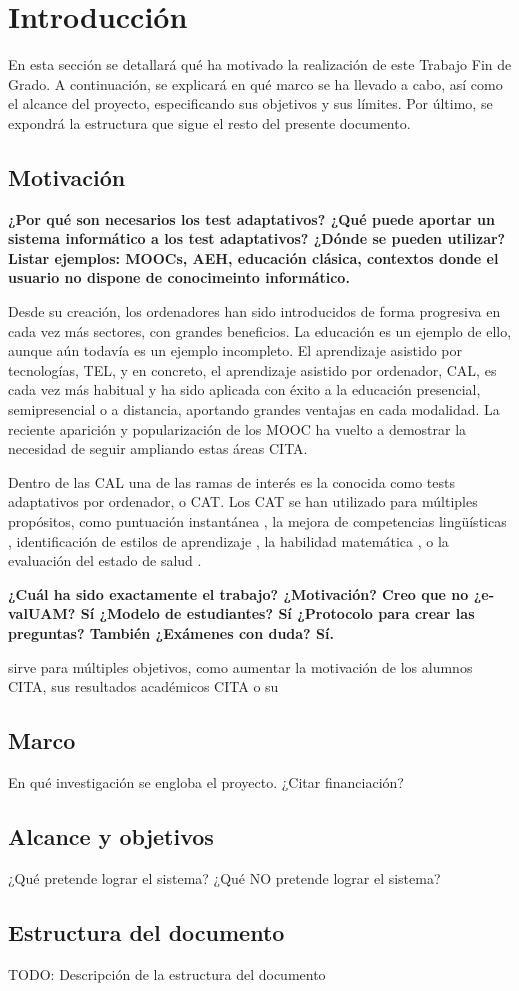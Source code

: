 \chapter{Introducción \label{sec:introduccion}}

En esta sección se detallará qué ha motivado la realización de este Trabajo Fin de Grado. A continuación, se explicará en qué marco se ha llevado a cabo, así como el alcance del proyecto, especificando sus objetivos y sus límites. Por último, se expondrá  la estructura que sigue el resto del presente documento.

\section{Motivación}

\textbf{¿Por qué son necesarios los test adaptativos?
¿Qué puede aportar un sistema informático a los test adaptativos?
¿Dónde se pueden utilizar?
Listar ejemplos: MOOCs, AEH, educación clásica, contextos donde el usuario no dispone de conocimeinto informático.}

Desde su creación, los ordenadores han sido introducidos de forma progresiva en cada vez más sectores, con grandes beneficios. La educación es un ejemplo de ello, aunque aún todavía es un ejemplo incompleto. El aprendizaje asistido por tecnologías, \acrshort{TEL}, y en concreto, el aprendizaje asistido por ordenador, \acrshort{CAL}, 
es cada vez más habitual y ha sido aplicada con éxito a la educación presencial, semipresencial o a distancia, aportando grandes ventajas en cada modalidad. La reciente aparición y popularización de los \acrshort{MOOC} ha vuelto a demostrar la necesidad de seguir ampliando estas áreas {CITA}.

Dentro de las \acrshort{CAL} una de las ramas de interés es la conocida como tests adaptativos por ordenador, o \acrshort{CAT}. Los \acrshort{CAT} se han utilizado para múltiples propósitos, como puntuación instantánea \cite{Wainer00}, la mejora de  competencias lingüísticas \cite{Chapelle06} , identificación de estilos de aprendizaje \cite{Ortigosa10}, la habilidad matemática \cite{Klinkenberg11}, o la evaluación del estado de salud \cite{Revicki97}.

\textbf{¿Cuál ha sido exactamente el trabajo? ¿Motivación? Creo que no ¿e-valUAM? Sí ¿Modelo de estudiantes? Sí ¿Protocolo para crear las preguntas? También ¿Exámenes con duda? Sí.}

 sirve para múltiples objetivos, como aumentar la motivación de los alumnos {CITA}, sus resultados académicos {CITA} o su 

\section{Marco}

En qué investigación se engloba el proyecto. ¿Citar financiación?

\section{Alcance y objetivos}

¿Qué pretende lograr el sistema?
¿Qué NO pretende lograr el sistema?

\section{Estructura del documento}

TODO: Descripción de la estructura del documento